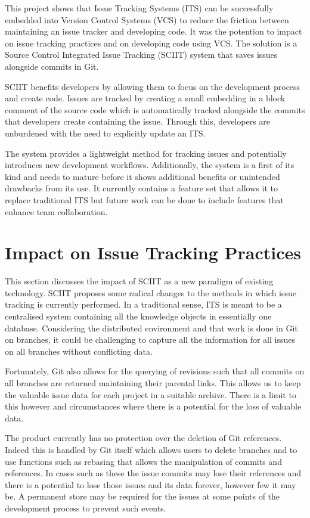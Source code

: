 \documentclass{mproj}
\begin{document}
This project shows that Issue Tracking Systems (ITS) can be successfully embedded into Version Control Systems (VCS) to reduce the friction between maintaining an issue tracker and developing code. It was the potention to impact on issue tracking practices and on developing code using VCS. The solution is a Source Control Integrated Issue Tracking (SCIIT) system that saves issues alongside commits in Git.

SCIIT benefits developers by allowing them to focus on the development process and create code. Issues are tracked by creating a small embedding in a block comment of the source code which is automatically tracked alongside the commits that developers create containing the issue. Through this, developers are unburdened with the need to explicitly update an ITS.

The system provides a lightweight method for tracking issues and potentially introduces new development workflows. Additionally, the system is a first of its kind and needs to mature before it shows additional benefits or unintended drawbacks from its use. It currently contains a feature set that allows it to replace traditional ITS but future work can be done to include features that enhance team collaboration.



\section{Impact on Issue Tracking Practices}

This section discusses the impact of SCIIT as a new paradigm of existing technology. SCIIT proposes some radical changes to the methods in which issue tracking is currently performed. In a traditional sense, ITS is meant to be a centralised system containing all the knowledge objects in essentially one database. Considering the distributed environment and that work is done in Git on branches, it could be challenging to capture all the information for all issues on all branches without conflicting data.

Fortunately, Git also allows for the querying of revisions such that all commits on all branches are returned maintaining their parental links. This allows us to keep the valuable issue data for each project in a suitable archive. There is a limit to this however and circumstances where there is a potential for the loss of valuable data.

The product currently has no protection over the deletion of Git references. Indeed this is handled by Git itself which allows users to delete branches and to use functions such as rebasing that allows the manipulation of commits and references. In cases such as these the issue commits may lose their references and there is a potential to lose those issues and its data forever, however few it may be. A permanent store may be required for the issues at some points of the development process to prevent such events.
\end{document}
